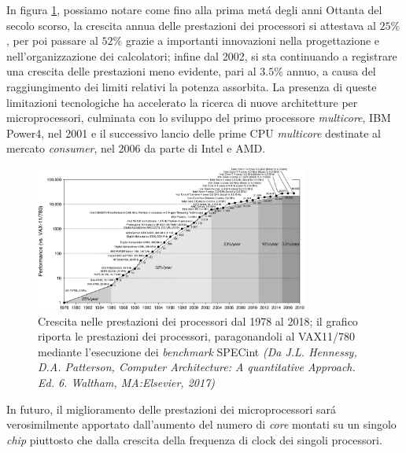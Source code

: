 In figura \ref{fig:PrestazioniProcessori}, possiamo notare come fino alla prima met\'a degli anni Ottanta del secolo scorso, la crescita annua delle prestazioni dei processori si attestava al $25\%$, per poi passare al $52\%$ grazie a importanti innovazioni nella progettazione e nell'organizzazione dei calcolatori; infine dal 2002, si sta continuando a registrare una crescita delle prestazioni meno evidente, pari al $3.5\%$ annuo, a causa del raggiungimento dei limiti relativi la potenza assorbita.\newline
La presenza di queste limitazioni tecnologiche ha accelerato la ricerca di nuove architetture per microprocessori, culminata con lo sviluppo del primo processore \textit{multicore}, IBM Power4, nel 2001 e il successivo lancio delle prime CPU \textit{multicore} destinate al mercato \textit{consumer}, nel 2006 da parte di Intel e AMD.
\begin{figure}[htbp]
    \centering
    \includegraphics[width=0.8\textwidth]{../Immagini/Capitolo 1/PrestazioniProcessori}
    \caption{Crescita nelle prestazioni dei processori dal 1978 al 2018; il grafico riporta le prestazioni dei processori, paragonandoli al VAX11/780 mediante l'esecuzione dei \textit{benchmark} SPECint \small{\textit{(Da J.L. Hennessy, D.A. Patterson, Computer Architecture: A quantitative Approach. Ed. 6. Waltham, MA:Elsevier, 2017)}}}
    \label{fig:PrestazioniProcessori}
\end{figure}

In futuro, il miglioramento delle prestazioni dei microprocessori sar\'a verosimilmente apportato dall'aumento del numero di \textit{core} montati su un singolo \textit{chip} piuttosto che dalla crescita della frequenza di clock dei singoli processori.